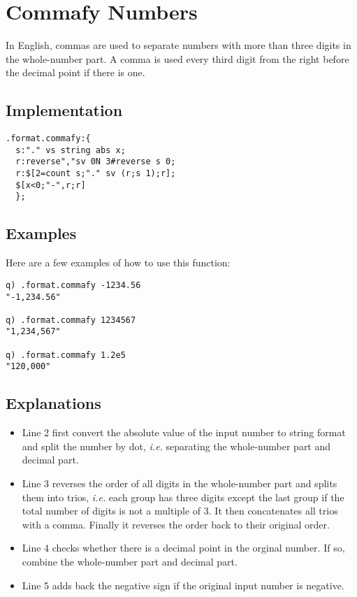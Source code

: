 \section{Commafy Numbers}

In English, commas are used to separate numbers with more than three digits in the whole-number part. A comma is used every third digit from the right before the decimal point if there is one.

\subsection{Implementation}

\begin{verbatim}
.format.commafy:{
  s:"." vs string abs x;
  r:reverse","sv 0N 3#reverse s 0;
  r:$[2=count s;"." sv (r;s 1);r];
  $[x<0;"-",r;r]
  };
\end{verbatim}

\subsection{Examples}
Here are a few examples of how to use this function:

\begin{verbatim}
q) .format.commafy -1234.56
"-1,234.56"

q) .format.commafy 1234567
"1,234,567"

q) .format.commafy 1.2e5
"120,000"
\end{verbatim}

\subsection{Explanations}
\begin{itemize}
\item Line 2 first convert the absolute value of the input number to string format and split the number by dot, \emph{i.e.} separating the whole-number part and decimal part.
\item Line 3 reverses the order of all digits in the whole-number part and splits them into trios, \emph{i.e.} each group has three digits except the last group if the total number of digits is not a multiple of 3. It then concatenates all trios with a comma. Finally it reverses the order back to their original order.
\item Line 4 checks whether there is a decimal point in the orginal number. If so, combine the whole-number part and decimal part. 
\item Line 5 adds back the negative sign if the original input number is negative.
\end{itemize}

